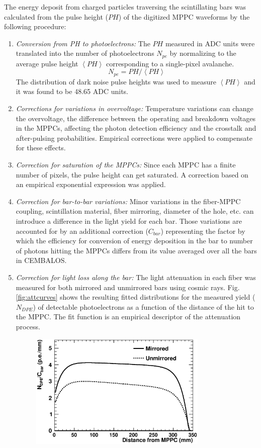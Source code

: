 The energy deposit from charged particles traversing the scintillating bars was calculated from the pulse height ($PH$) of the digitized MPPC waveforms by the following procedure:

\begin{enumerate}
\item {\it Conversion from PH to photoelectrons:} The $PH$ measured in ADC units were translated into the number of photoelectrons $N_{pe}$ by normalizing to the average pulse height $\left\langle PH \right\rangle$ corresponding to a single-pixel avalanche. 
\begin{equation}
N_{pe} = PH/\left\langle PH \right\rangle
\end{equation}
The distribution of dark noise pulse heights was used to measure $\left\langle PH \right\rangle$ and it was found to be 48.65 ADC units. 
\item{\it Corrections for variations in overvoltage:} Temperature variations can change the overvoltage, the difference between the operating and breakdown voltages in the MPPCs, affecting the photon detection efficiency and the crosstalk and after-pulsing probabilities. Empirical corrections were applied to compensate for these effects.
\item{\it Correction for saturation of the MPPCs:} Since each MPPC has a finite number of pixels, the pulse height can get saturated. A correction based on an empirical exponential expression was applied.
\item{\it Correction for bar-to-bar variations:} Minor variations in the fiber-MPPC coupling, scintillation material, fiber mirroring, diameter of the hole, etc. can introduce a difference in the light yield for each bar. Those variations are accounted for by an additional correction ($C_{bar}$) representing the factor by which the efficiency for conversion of energy deposition in the bar to number of photons hitting the MPPCs differs from its value averaged over all the bars in CEMBALOS.
\item{\it Correction for light loss along the bar:} The light attenuation in each fiber was measured for both mirrored and unmirrored bars using cosmic rays. Fig. \ref{fig:attcurves} shows the resulting fitted distributions for the measured yield ($N_{DPE}$) of detectable photoelectrons as a function of the distance of the hit to the MPPC. The fit function is an empirical descriptor of the attenuation process.
\begin{figure}[!h]
\begin{center}
\includegraphics[width=85mm]{figures/attcurves_paper.eps}

\end{center}
\end{figure}
\end{enumerate}
